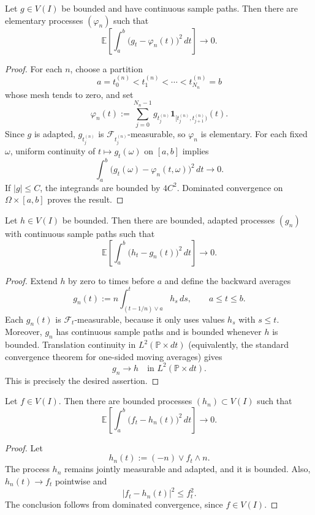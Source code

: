\begin{lemma}
Let $g\in V(I)$ be bounded and have continuous sample paths. Then there are
elementary processes $(\varphi_n)$ such that
\[
  \mathbb{E}\left[\int_a^b\bigl(g_t-\varphi_n(t)\bigr)^2\,dt\right]
  \longrightarrow0.
\]
\end{lemma}
\begin{proof}
For each $n$, choose a partition
\[
  a=t^{(n)}_0<t^{(n)}_1<\cdots<t^{(n)}_{N_n}=b
\]
whose mesh tends to zero, and set
\[
  \varphi_n(t)
  :=\sum_{j=0}^{N_n-1}g_{t_j^{(n)}}
  \mathbf{1}_{[t_j^{(n)},t_{j+1}^{(n)})}(t).
\]
Since $g$ is adapted, $g_{t_j^{(n)}}$ is
$\mathcal{F}_{t_j^{(n)}}$-measurable, so $\varphi_n$ is elementary. For each
fixed $\omega$, uniform continuity of $t\mapsto g_t(\omega)$ on $[a,b]$
implies
\[
  \int_a^b\bigl(g_t(\omega)-\varphi_n(t,\omega)\bigr)^2\,dt\to0.
\]
If $|g|\le C$, the integrands are bounded by $4C^2$. Dominated convergence
on $\Omega\times[a,b]$ proves the result.
\end{proof}

\begin{lemma}
Let $h\in V(I)$ be bounded. Then there are bounded, adapted processes
$(g_n)$ with continuous sample paths such that
\[
  \mathbb{E}\left[\int_a^b\bigl(h_t-g_n(t)\bigr)^2\,dt\right]
  \longrightarrow0.
\]
\end{lemma}
\begin{proof}
Extend $h$ by zero to times before $a$ and define the backward averages
\[
  g_n(t):=n\int_{(t-1/n)\vee a}^{t}h_s\,ds,
  \qquad a\le t\le b.
\]
Each $g_n(t)$ is $\mathcal{F}_t$-measurable, because it only uses values
$h_s$ with $s\le t$. Moreover, $g_n$ has continuous sample paths and is
bounded whenever $h$ is bounded. Translation continuity in
$L^2(\mathbb{P}\times dt)$ (equivalently, the standard convergence theorem
for one-sided moving averages) gives
\[
  g_n\longrightarrow h\quad\text{in }L^2(\mathbb{P}\times dt).
\]
This is precisely the desired assertion.
\end{proof}

\begin{lemma}
Let $f\in V(I)$. Then there are bounded processes $(h_n)\subset V(I)$ such
that
\[
  \mathbb{E}\left[\int_a^b\bigl(f_t-h_n(t)\bigr)^2\,dt\right]
  \longrightarrow0.
\]
\end{lemma}
\begin{proof}
Let
\[
  h_n(t):=(-n)\vee f_t\wedge n.
\]
The process $h_n$ remains jointly measurable and adapted, and it is bounded.
Also, $h_n(t)\to f_t$ pointwise and
\[
  |f_t-h_n(t)|^2\le f_t^2.
\]
The conclusion follows from dominated convergence, since
$f\in V(I)$.
\end{proof}

